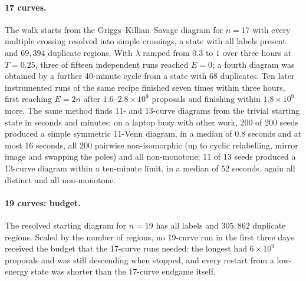 \documentclass[11pt]{article}
\begin{document}
\paragraph{17 curves.} The walk starts from the Griggs--Killian--Savage diagram \cite{GKS04} for $n=17$ with every multiple
crossing resolved into simple crossings, a state with all labels present and $69{,}394$ duplicate regions. With
$\lambda$ ramped from $0.3$ to $1$ over three hours at $T=0.25$, three of fifteen independent runs reached $E=0$; a
fourth diagram was obtained by a further 40-minute cycle from a state with $68$ duplicates. Ten later instrumented
runs of the same recipe finished seven times within three hours, first reaching $E=2n$ after $1.6$--$2.8\times10^9$
proposals and finishing within $1.8\times10^9$ more. The same method finds 11- and 13-curve diagrams from the trivial
starting state in seconds and minutes: on a laptop busy with other work, 200 of 200 seeds produced a simple symmetric
11-Venn diagram, in a median of 0.8 seconds and at most 16 seconds, all 200 pairwise non-isomorphic (up to cyclic
relabelling, mirror image and swapping the poles) and all non-monotone; 11 of 13 seeds produced a 13-curve diagram within
a ten-minute limit, in a median of 52 seconds, again all distinct and all non-monotone.

\paragraph{19 curves: budget.} The resolved starting diagram for $n=19$ has all labels and $305{,}862$ duplicate
regions. Scaled by the number of regions, no 19-curve run in the first three days received the budget that the
17-curve runs needed: the longest had $6\times10^9$ proposals and was still descending when stopped, and every restart
from a low-energy state was shorter than the 17-curve endgame itself.
\end{document}
